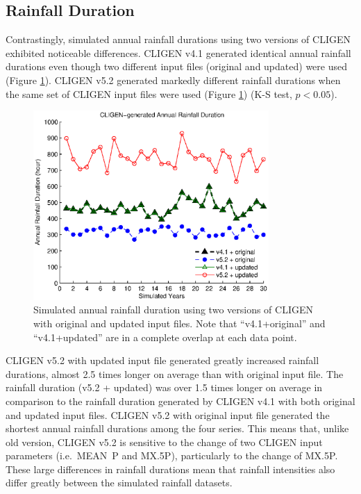 \subsection{Rainfall Duration}
Contrastingly, simulated annual rainfall durations using two versions of CLIGEN
exhibited noticeable differences. CLIGEN v4.1 generated identical annual
rainfall durations even though two different input files (original
and updated) were used (Figure \ref{fig:cligen_annual_duration}). CLIGEN v5.2
generated markedly different rainfall durations when the same set of CLIGEN
input files were used (Figure \ref{fig:cligen_annual_duration}) (K-S test,
$p<0.05$).

\begin{figure}[htbp]
  \centering
\includegraphics[width=0.8\textwidth]{./img/cligen_annual_duration_series}
  \caption{Simulated annual rainfall duration using two versions of CLIGEN
with original and updated input files. Note that ``v4.1+original'' and
``v4.1+updated'' are in a complete overlap at each data point.}
  \label{fig:cligen_annual_duration}
\end{figure}

CLIGEN v5.2 with updated input file generated greatly increased rainfall
durations, almost 2.5 times longer on average than with original input file. The
rainfall duration (v5.2 + updated) was over 1.5 times longer on average in
comparison to the rainfall duration generated by CLIGEN v4.1 with both
original and updated input files. CLIGEN v5.2 with original input file
generated the shortest annual rainfall durations among the four series.
This means that, unlike old version, CLIGEN v5.2 is sensitive to the change of
two CLIGEN input parameters (i.e.\ MEAN~P and {MX.5P}), particularly to the
change of {MX.5P}. These large differences in rainfall durations mean that
rainfall intensities also differ greatly between the simulated rainfall
datasets.

